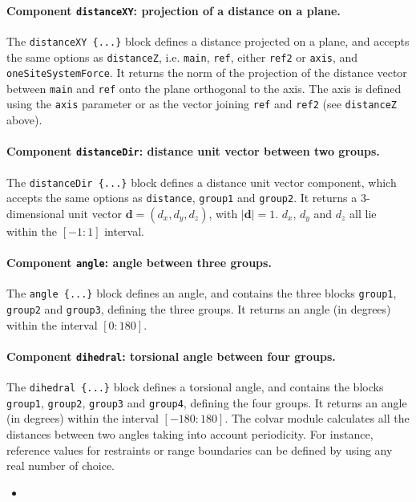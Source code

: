 \paragraph*{Component \texttt{distanceXY}: projection of a distance on a plane.}
The \texttt{distanceXY~\{...\}} block defines a distance projected on
a plane, and accepts the same options as \texttt{distanceZ}, i.e.
\texttt{main}, \texttt{ref}, either \texttt{ref2} or \texttt{axis},
and \texttt{oneSiteSystemForce}.  It returns the norm of the
projection of the distance vector between \texttt{main} and
\texttt{ref} onto the plane orthogonal to the axis.  The axis is
defined using the \texttt{axis} parameter or as the vector joining
\texttt{ref} and \texttt{ref2} (see \texttt{distanceZ} above).


\paragraph*{Component \texttt{distanceDir}: distance unit vector
  between two groups.}  The \texttt{distanceDir~\{...\}} block defines
a distance unit vector component, which accepts the same options as
\texttt{distance}, \texttt{group1} and \texttt{group2}.  It returns a
3-dimensional unit vector $\mathbf{d} = (d_{x}, d_{y}, d_{z})$, with
$|\mathbf{d}| = 1$.  $d_{x}$, $d_{y}$ and $d_{z}$ all lie within the
$[-1:1]$ interval.


\paragraph*{Component \texttt{angle}: angle between three groups.}
The \texttt{angle~\{...\}} block defines an angle, and contains the
three blocks \texttt{group1}, \texttt{group2} and \texttt{group3}, defining
the three groups.  It returns an angle (in degrees) within the
interval $[0:180]$.


\paragraph*{Component \texttt{dihedral}: torsional angle between four groups.}
The \texttt{dihedral~\{...\}} block defines a torsional angle, and
contains the blocks \texttt{group1}, \texttt{group2}, \texttt{group3}
and \texttt{group4}, defining the four groups.  It returns an angle
(in degrees) within the interval $[-180:180]$.  The colvar module
calculates all the distances between two angles taking into account
periodicity.  For instance, reference values for restraints or range
boundaries can be defined by using any real number of choice.
\begin{itemize}
\item {}
\end{itemize}


